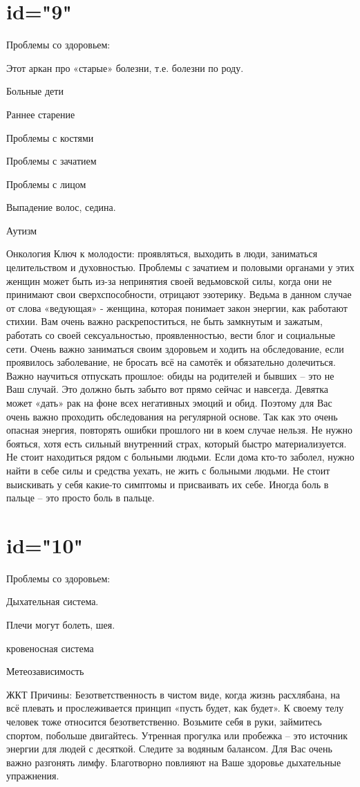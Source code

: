 \section{id="9"}{Проблемы со здоровьем:}
\item Этот аркан про «старые» болезни, т.е. болезни по роду.
\item Больные дети
\item Раннее старение
\item Проблемы с костями
\item Проблемы с зачатием
\item Проблемы с лицом
\item Выпадение волос, седина.
\item Аутизм
\item Онкология
Ключ к молодости: проявляться, выходить в люди, заниматься целительством 
и духовностью. 
Проблемы с зачатием и половыми органами у этих женщин может быть из-за 
непринятия своей ведьмовской силы, когда они не принимают свои 
сверхспособности, отрицают эзотерику. 
Ведьма в данном случае от слова «ведующая» - женщина, которая понимает 
закон энергии, как работают стихии.
Вам очень важно раскрепоститься, не быть замкнутым и зажатым, работать 
со своей сексуальностью, проявленностью, вести блог и социальные сети. 
Очень важно заниматься своим здоровьем и ходить на обследование, если 
проявилось заболевание, не бросать всё на самотёк и обязательно долечиться. 
Важно научиться отпускать прошлое: обиды на родителей и бывших – это не 
Ваш случай. Это должно быть забыто вот прямо сейчас и навсегда.
Девятка может «дать» рак на фоне всех негативных эмоций и обид. 
Поэтому для Вас очень важно проходить обследования на регулярной основе. 
Так как это очень опасная энергия, повторять ошибки прошлого ни в коем 
случае нельзя. 
Не нужно бояться, хотя есть сильный внутренний страх, который быстро 
материализуется. Не стоит находиться рядом с больными людьми. Если дома 
кто-то заболел, нужно найти в себе силы и средства уехать, не жить с 
больными людьми. Не стоит выискивать у себя какие-то симптомы и присваивать 
их себе. Иногда боль в пальце – это просто боль в пальце.
\endsection

\section{id="10"}{Проблемы со здоровьем:}
\item Дыхательная система.
\item Плечи могут болеть, шея.
\item кровеносная система
\item Метеозависимость
\item ЖКТ
Причины: Безответственность в чистом виде, когда жизнь расхлябана, 
на всё плевать и прослеживается принцип «пусть будет, как будет». 
К своему телу человек тоже относится безответственно. 
Возьмите себя в руки, займитесь спортом, побольше двигайтесь. 
Утренная прогулка или пробежка – это источник энергии для людей с десяткой. 
Следите за водяным балансом. Для Вас очень важно разгонять лимфу. 
Благотворно повлияют на Ваше здоровье дыхательные упражнения.
\endsection

